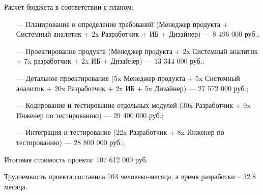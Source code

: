 Расчет бюджета в соответствии с планом:
\begin{itemize}
    \item[---] Планирование и определение требований (Менеджер продукта + Системный аналитик + 2x Разработчик + ИБ + Дизайнер) --- 8 496 000 руб.;
    \item[---] Проектирование продукта (Менеджер продукта + 2x Системный аналитик + 7x разработчик + 2x ИБ + Дизайнер) --- 13 344 000 руб.;
    \item[---] Детальное проектирование (5x Менеджер продукта + 5x Системный аналитик + 20x Разработчик + 2x ИБ + 5x Дизайнер) --- 27 572 000 руб.;
    \item[---] Кодирование и тестирование отдельных модулей (30x Разработчик + 9x Инженер по тестированию) --- 29 400 000 руб.;
    \item[---] Интеграция и тестирование (22x Разработчик + 8x Инженер по тестированию) --- 28 800 000 руб.; 
\end{itemize}

Итоговая стоимость проекта: 107 612 000 руб.

Трудоемкость проекта составила 703 человеко-месяца, а время разработки – 32.8 месяца.